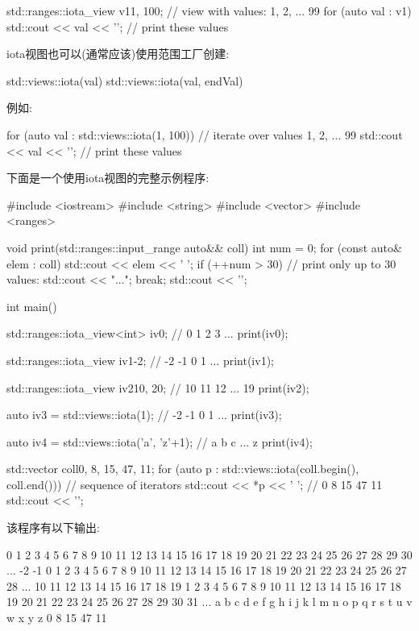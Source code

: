 \begin{cpp}
std::ranges::iota_view v1{1, 100}; // view with values: 1, 2, ... 99
for (auto val : v1) {
	std::cout << val << '\n'; // print these values
}
\end{cpp}


iota视图也可以(通常应该)使用范围工厂创建:

\begin{cpp}
std::views::iota(val)
std::views::iota(val, endVal)
\end{cpp}

例如:

\begin{cpp}
for (auto val : std::views::iota(1, 100)) { // iterate over values 1, 2, ... 99
	std::cout << val << '\n'; // print these values
}
\end{cpp}

下面是一个使用iota视图的完整示例程序:


\begin{cpp}
#include <iostream>
#include <string>
#include <vector>
#include <ranges>

void print(std::ranges::input_range auto&& coll)
{
	int num = 0;
	for (const auto& elem : coll) {
		std::cout << elem << ' ';
		if (++num > 30) { // print only up to 30 values:
			std::cout << "...";
			break;
		}
	}
	std::cout << '\n';
}

int main()
{
	std::ranges::iota_view<int> iv0; // 0 1 2 3 ...
	print(iv0);
	
	std::ranges::iota_view iv1{-2}; // -2 -1 0 1 ...
	print(iv1);
	
	std::ranges::iota_view iv2{10, 20}; // 10 11 12 ... 19
	print(iv2);
	
	auto iv3 = std::views::iota(1); // -2 -1 0 1 ...
	print(iv3);
	
	auto iv4 = std::views::iota('a', 'z'+1); // a b c ... z
	print(iv4);
	
	std::vector coll{0, 8, 15, 47, 11};
	for (auto p : std::views::iota(coll.begin(), coll.end())) { // sequence of iterators
		std::cout << *p << ' '; // 0 8 15 47 11
	}
	std::cout << '\n';
}
\end{cpp}

该程序有以下输出:

\begin{shell}
0 1 2 3 4 5 6 7 8 9 10 11 12 13 14 15 16 17 18 19 20 21 22 23 24 25 26 27 28 29 30 ...
-2 -1 0 1 2 3 4 5 6 7 8 9 10 11 12 13 14 15 16 17 18 19 20 21 22 23 24 25 26 27 28 ...
10 11 12 13 14 15 16 17 18 19
1 2 3 4 5 6 7 8 9 10 11 12 13 14 15 16 17 18 19 20 21 22 23 24 25 26 27 28 29 30 31 ...
a b c d e f g h i j k l m n o p q r s t u v w x y z
0 8 15 47 11	
\end{shell}

